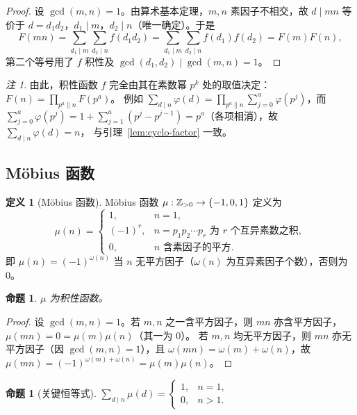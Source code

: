 \documentclass{article}
\theoremstyle{plain}
\newtheorem{prop}[thm]{命题}
\theoremstyle{definition}
\newtheorem{defn}[thm]{定义}
\theoremstyle{remark}
\newtheorem{rem}[thm]{注}
\begin{document}
\begin{proof}
  设 $\gcd(m,n)=1$。由算术基本定理，$m,n$ 素因子不相交，故 $d\mid mn$ 等价于 $d=d_1d_2$，$d_1\mid m$，$d_2\mid n$（唯一确定）。于是
  \[
    F(mn)=\sum_{d_1\mid m}\sum_{d_2\mid n}f(d_1d_2)=\sum_{d_1\mid m}\sum_{d_2\mid n}f(d_1)f(d_2)=F(m)F(n),
  \]
  第二个等号用了 $f$ 积性及 $\gcd(d_1,d_2)\mid\gcd(m,n)=1$。
\end{proof}

\begin{rem}
  由此，积性函数 $f$ 完全由其在素数幂 $p^k$ 处的取值决定：$F(n)=\prod_{p^a\parallel n}F(p^a)$。
  例如 $\sum_{d\mid n}\varphi(d)=\prod_{p^a\parallel n}\sum_{j=0}^a\varphi(p^j)$，而
  $\sum_{j=0}^a\varphi(p^j)=1+\sum_{j=1}^a(p^j-p^{j-1})=p^a$（各项相消），故 $\sum_{d\mid n}\varphi(d)=n$，
  与引理~\ref{lem:cyclo-factor} 一致。
\end{rem}

\subsection{Möbius 函数}

\begin{defn}[Möbius 函数]
  Möbius 函数 $\mu:\mathbb{Z}_{>0}\to\{-1,0,1\}$ 定义为
  \[
    \mu(n)=\begin{cases}
      1,& n=1,\\
      (-1)^r,& n=p_1p_2\cdots p_r\text{ 为 }r\text{ 个互异素数之积},\\
      0,& n\text{ 含素因子的平方}.
    \end{cases}
  \]
  即 $\mu(n)=(-1)^{\omega(n)}$ 当 $n$ 无平方因子（$\omega(n)$ 为互异素因子个数），否则为 $0$。
\end{defn}

\begin{prop}\label{prop:mu-mult}
  $\mu$ 为积性函数。
\end{prop}

\begin{proof}
  设 $\gcd(m,n)=1$。若 $m,n$ 之一含平方因子，则 $mn$ 亦含平方因子，$\mu(mn)=0=\mu(m)\mu(n)$（其一为 $0$）。
  若 $m,n$ 均无平方因子，则 $mn$ 亦无平方因子（因 $\gcd(m,n)=1$），且 $\omega(mn)=\omega(m)+\omega(n)$，故
  $\mu(mn)=(-1)^{\omega(m)+\omega(n)}=\mu(m)\mu(n)$。
\end{proof}

\begin{prop}[关键恒等式]\label{prop:mu-sum}
  $\displaystyle\sum_{d\mid n}\mu(d)=\begin{cases}1,& n=1,\\0,& n>1.\end{cases}$
\end{prop}
\end{document}

